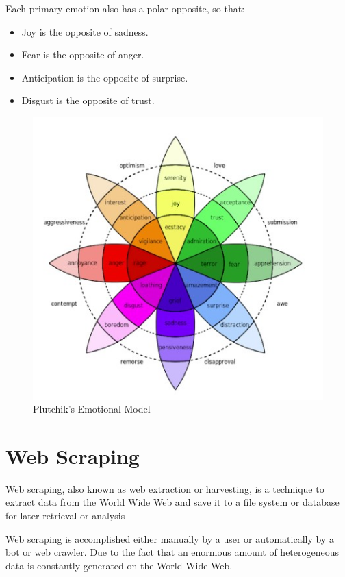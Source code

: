 Each primary emotion also has a polar opposite, so that:
\begin{itemize}
	\item Joy is the opposite of sadness.
	\item Fear is the opposite of anger.
	\item Anticipation is the opposite of surprise.
	\item Disgust is the opposite of trust.
\end{itemize}


\begin{figure}[H]
\centering
\includegraphics[width=\textwidth]{imgs/plutchik_model.jpg}
\caption{Plutchik's Emotional Model}
\label{fig: plutchik model}
\end{figure}


\section{Web Scraping}
Web scraping, also known as web extraction or harvesting, is a technique to extract data from the World Wide Web and save it to a file system or database for later retrieval or analysis\cite{webscraping}\newline

Web scraping is accomplished either manually by a user or automatically by a bot or web crawler. Due to the fact that an enormous amount of heterogeneous data is constantly generated on the World Wide Web.\newline

